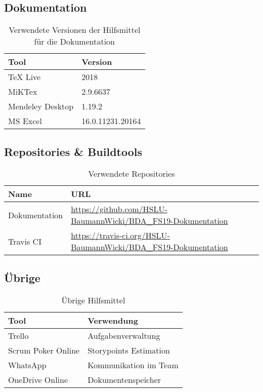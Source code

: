 \subsection{Dokumentation}
\begin{table}[h!]
	\begin{tabular}{p{} p{}}
		\hline
		\textbf{Tool} & \textbf{Version} \\
		\hline
		TeX Live & 2018 \\
		\hline
		MiKTex & 2.9.6637 \\
		\hline
		Mendeley Desktop & 1.19.2 \\
		\hline
		MS Excel & 16.0.11231.20164 \\
		\hline
	\end{tabular}
	\caption{Verwendete Versionen der Hilfsmittel für die Dokumentation}
\end{table}


\subsection{Repositories \& Buildtools}
\begin{table}[h!]
	\begin{tabular}{p{} p{}}
		\hline
		\textbf{Name} & \textbf{URL} \\
		\hline
		Dokumentation & \url{https://github.com/HSLU-BaumannWicki/BDA_FS19-Dokumentation} \\
		\hline	
		Travis CI &  \url{https://travis-ci.org/HSLU-BaumannWicki/BDA_FS19-Dokumentation} \\
		\hline
	\end{tabular}
	\caption{Verwendete Repositories}
\end{table}

\subsection{Übrige}
\begin{table}[h!]
	\begin{tabular}{p{} p{}}
		\hline
		\textbf{Tool} & \textbf{Verwendung} \\
		\hline
		Trello & Aufgabenverwaltung \\
		\hline
		Scrum Poker Online & Storypoints Estimation\\
		\hline
		WhatsApp & Kommunikation im Team \\
		\hline
		OneDrive Online & Dokumentenspeicher \\
		\hline	
	\end{tabular}
	\caption{Übrige Hilfsmittel}
\end{table}

